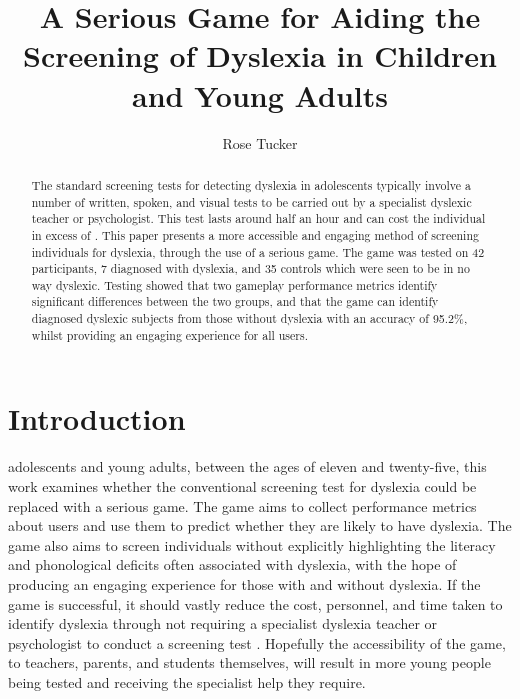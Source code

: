 \documentclass[journal]{IEEEtran}
\begin{document}
\title{\textbf{A Serious Game for Aiding the Screening of Dyslexia in Children and Young Adults}}
\author{Rose Tucker}

\maketitle

\begin{abstract}

The standard screening tests for detecting dyslexia in adolescents typically involve a number of written, spoken, and visual tests to be carried out by a specialist dyslexic teacher or psychologist.
This test lasts around half an hour and can cost the individual in excess of . 
This paper presents a more accessible and engaging method of screening individuals
 for dyslexia, through the use of a serious game. 
The game was tested on 42 participants, 7 diagnosed with dyslexia, and 35 controls which were seen to be in no way dyslexic. 
Testing showed that two gameplay performance metrics identify significant differences between the two groups, and that the game can identify diagnosed dyslexic subjects from those without dyslexia with an accuracy of 95.2\%, whilst providing an engaging experience for all users.
\end{abstract}

\section{Introduction}
\label{sec:intro}

 adolescents and young adults, between the ages of eleven and twenty-five, this work examines whether the conventional screening test for dyslexia could be replaced with a serious game. 
The game aims to collect performance metrics about users and use them to predict whether they are likely to have dyslexia. 
The game also aims to screen individuals without explicitly highlighting the literacy and phonological deficits often associated with dyslexia, with the hope of producing an engaging experience for those with and without dyslexia. 
If the game is successful, it should vastly reduce the cost, personnel, and time taken to identify dyslexia through not requiring a specialist dyslexia teacher or psychologist to conduct a screening test \cite{bda, dast}. 
Hopefully the accessibility of the game, to teachers, parents, and students themselves, will result in more young people being tested and receiving the specialist help they require.
\end{document}
